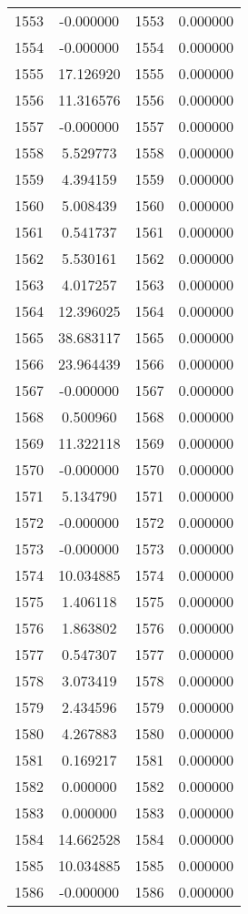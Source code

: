 \documentclass[12pt]{article}
\begin{document}
\begin{longtable}{@{}cccc@{}}
1553 & -0.000000 & 1553 & 0.000000 \\
1554 & -0.000000 & 1554 & 0.000000 \\
1555 & 17.126920 & 1555 & 0.000000 \\
1556 & 11.316576 & 1556 & 0.000000 \\
1557 & -0.000000 & 1557 & 0.000000 \\
1558 & 5.529773 & 1558 & 0.000000 \\
1559 & 4.394159 & 1559 & 0.000000 \\
1560 & 5.008439 & 1560 & 0.000000 \\
1561 & 0.541737 & 1561 & 0.000000 \\
1562 & 5.530161 & 1562 & 0.000000 \\
1563 & 4.017257 & 1563 & 0.000000 \\
1564 & 12.396025 & 1564 & 0.000000 \\
1565 & 38.683117 & 1565 & 0.000000 \\
1566 & 23.964439 & 1566 & 0.000000 \\
1567 & -0.000000 & 1567 & 0.000000 \\
1568 & 0.500960 & 1568 & 0.000000 \\
1569 & 11.322118 & 1569 & 0.000000 \\
1570 & -0.000000 & 1570 & 0.000000 \\
1571 & 5.134790 & 1571 & 0.000000 \\
1572 & -0.000000 & 1572 & 0.000000 \\
1573 & -0.000000 & 1573 & 0.000000 \\
1574 & 10.034885 & 1574 & 0.000000 \\
1575 & 1.406118 & 1575 & 0.000000 \\
1576 & 1.863802 & 1576 & 0.000000 \\
1577 & 0.547307 & 1577 & 0.000000 \\
1578 & 3.073419 & 1578 & 0.000000 \\
1579 & 2.434596 & 1579 & 0.000000 \\
1580 & 4.267883 & 1580 & 0.000000 \\
1581 & 0.169217 & 1581 & 0.000000 \\
1582 & 0.000000 & 1582 & 0.000000 \\
1583 & 0.000000 & 1583 & 0.000000 \\
1584 & 14.662528 & 1584 & 0.000000 \\
1585 & 10.034885 & 1585 & 0.000000 \\
1586 & -0.000000 & 1586 & 0.000000 \\

\end{longtable}
\end{document}
